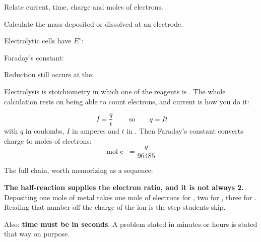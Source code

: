\documentclass{apchem-notes}
\begin{document}
\begin{objectives}
  \item Relate current, time, charge and moles of electrons.
  \item Calculate the mass deposited or dissolved at an electrode.
\end{objectives}


\begin{warmup}[3]
  \item Electrolytic cells have $E^\circ$:
  \item Faraday's constant: 
  \item Reduction still occurs at the:
\end{warmup}



Electrolysis is stoichiometry in which one of the reagents is
. The whole calculation rests on being able
to count electrons, and current is how you do it:

\[ \boxed{\;I = \frac{q}{t}\;} \qquad\text{so}\qquad
   q = It \]
with $q$ in coulombs, $I$ in amperes and $t$ in
. Then Faraday's constant converts charge to
moles of electrons:
\[ \text{mol e}^- = \frac{q}{96485} \]

The full chain, worth memorizing as a sequence:
\begin{center}
\end{center}

\begin{apctrap}
\textbf{The half-reaction supplies the electron ratio, and it is not always
2.} Depositing one mole of metal takes one mole of electrons for
, two for , three for . Reading that number off
the charge of the ion is the step students skip.

Also: \textbf{time must be in seconds}. A problem stated in minutes or hours
is stated that way on purpose.
\end{apctrap}
\end{document}
